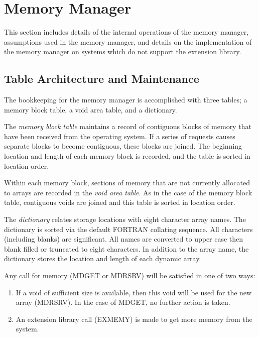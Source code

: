 \section{Memory Manager} \label{sec:table}
This section includes details of the internal operations of the memory
manager, assumptions used in the memory manager, and details on the
implementation of the memory manager on systems which do not support the
extension library.


\subsection{Table Architecture and Maintenance} 
The bookkeeping for the memory manager is accomplished with three tables; a
memory block table, a void area table, and a dictionary.

The {\em 
memory block table} maintains a record of contiguous blocks of memory
that have been received from the operating system.  If a series of requests
causes separate blocks to become contiguous, these blocks are joined.  The
beginning location and length of each memory block is recorded, and the
table is sorted in location order.

Within each memory block, sections of memory that are not currently
allocated to arrays are recorded in the {\em void area table}.  As in the
case of the memory block table, contiguous voids are joined and this table
is sorted in location order. 

The {\em dictionary} relates storage locations with eight character array
names. The dictionary is sorted via the default FORTRAN collating sequence.
All characters (including blanks) are significant.
All names are converted to upper case then
blank filled or truncated to eight characters.
In addition to the array name, the
dictionary stores the location and length of each dynamic array. 

Any call for memory (MDGET or MDRSRV) will be satisfied in one of two ways:
\begin{enumerate}
\item If a void of sufficient size is available, then this void will be
          used for the new array (MDRSRV).  In the case of MDGET, no further
          action is taken.

\item An extension library call (EXMEMY) is made to get more memory from
          the system.
\end{enumerate}

